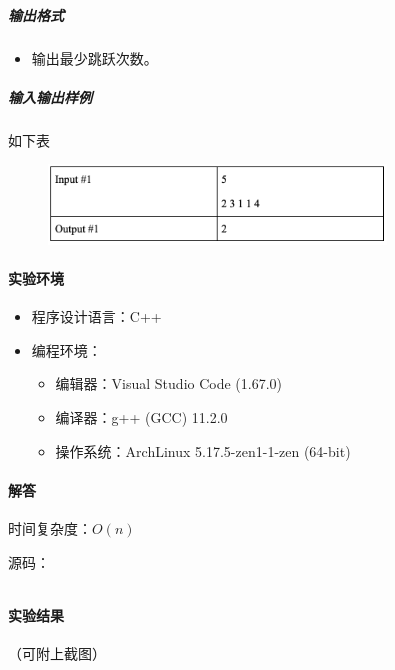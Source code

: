\documentclass[12pt,a4paper]{ctexart}
\begin{document}
\subparagraph{输出格式}
    \begin{itemize}
        \item 输出最少跳跃次数。
    \end{itemize}
    
\subparagraph{输入输出样例}
如下表
    \begin{figure}[h]
        \centering
        \includegraphics[width=0.80\textwidth]{q2_iodata.png}
    \end{figure}


\vspace{5pt}

\paragraph{实验环境}
\begin{itemize}
    \item 程序设计语言：C++
    \item 编程环境：
    \begin{itemize}
        \item 编辑器：Visual Studio Code (1.67.0)
        \item 编译器：g++ (GCC) 11.2.0
        \item 操作系统：ArchLinux 5.17.5-zen1-1-zen (64-bit)
    \end{itemize}
\end{itemize}

\vspace{5pt}

\paragraph{解答} 时间复杂度：$O(n)$

源码：
\inputminted[bgcolor=codebg,frame=lines,autogobble,linenos=true,breaklines]{cpp}{src/t2.cpp}

\vspace{5pt}

\paragraph{实验结果}
（可附上截图）

\newpage
\end{document}
